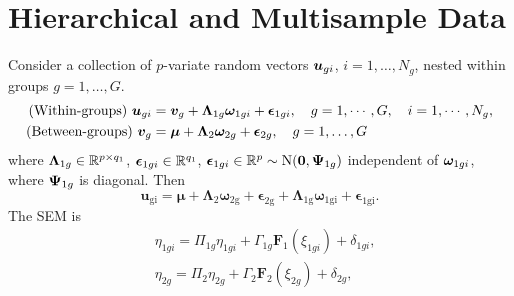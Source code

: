 \documentclass[10pt,a4paper]{book}
\begin{document}
\section{Hierarchical and Multisample
Data}
\begin{defbox}
	\begin{definition}
	Consider a collection of $p$-variate random vectors ${\boldsymbol u}_{gi}$, $i=1,\ldots,N_g$, nested within groups $g=1,\ldots,G$.   
	\begin{align*}
		\text{(Within-groups) }{\boldsymbol u}_{gi}&={\boldsymbol v}_{g}+{\boldsymbol\Lambda}_{1g}{\boldsymbol\omega}_{1gi}+{\boldsymbol\epsilon}_{1gi},\quad g=1,\cdots,G,\quad i=1,\cdots,N_{g},\\
		\text{(Between-groups) }{\boldsymbol v}_g&={\boldsymbol\mu}+{\boldsymbol\Lambda}_2{\boldsymbol\omega}_{2g}+{\boldsymbol\epsilon}_{2g},\quad g=1,\ldots,G
	\end{align*}
	where ${\boldsymbol\Lambda}_{1g}\in\mathbb R^{p\times q_1}$, ${\boldsymbol\epsilon}_{1gi}\in\mathbb R^{q_1}$, ${\boldsymbol\epsilon}_{1gi}\in\mathbb R^{p}\sim\mathrm{N}({\boldsymbol 0},{\boldsymbol\Psi}_{1g})$ independent of ${\boldsymbol\omega}_{1gi}$, where ${\boldsymbol\Psi}_{1g}$ is diagonal. Then 
	\begin{equation*}
		\mathbf{u}_{\mathrm{gi}}=\mathbf{\mu}+\mathbf{\Lambda}_{2}\mathbf{\omega}_{2\mathrm{g}}+\mathbf{\epsilon}_{2\mathrm{g}}+\mathbf{\Lambda}_{1\mathrm{g}}\mathbf{\omega}_{1\mathrm{gi}}+\mathbf{\epsilon}_{1\mathrm{gi}}.
	\end{equation*}  
	The SEM is 
	\begin{equation*}
		\begin{aligned}&\eta_{1gi}=\Pi_{1g}\eta_{1gi}+\Gamma_{1g}\mathbf{F}_1(\xi_{1gi})+\delta_{1gi},\\&\eta_{2g}=\Pi_2\eta_{2g}+\Gamma_2\mathbf{F}_2(\xi_{2g})+\delta_{2g},\end{aligned}
	\end{equation*}
	\end{definition}
\end{defbox}





\end{document}
